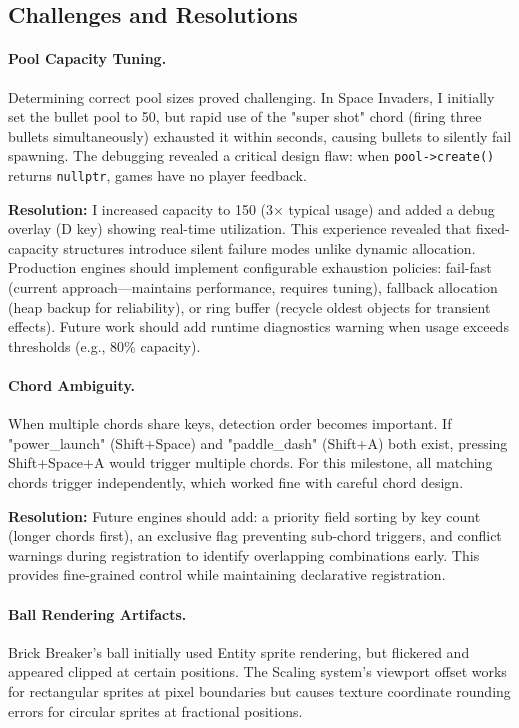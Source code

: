 \documentclass[12pt]{article}
\begin{document}
\subsection{Challenges and Resolutions}

\paragraph{Pool Capacity Tuning.}
Determining correct pool sizes proved challenging. In Space Invaders, I initially set the bullet pool to 50, but rapid use of the "super shot" chord (firing three bullets simultaneously) exhausted it within seconds, causing bullets to silently fail spawning. The debugging revealed a critical design flaw: when \texttt{pool->create()} returns \texttt{nullptr}, games have no player feedback.

\textbf{Resolution:} I increased capacity to 150 (3× typical usage) and added a debug overlay (D key) showing real-time utilization. This experience revealed that fixed-capacity structures introduce silent failure modes unlike dynamic allocation. Production engines should implement configurable exhaustion policies: fail-fast (current approach—maintains performance, requires tuning), fallback allocation (heap backup for reliability), or ring buffer (recycle oldest objects for transient effects). Future work should add runtime diagnostics warning when usage exceeds thresholds (e.g., 80\% capacity).

\paragraph{Chord Ambiguity.}
When multiple chords share keys, detection order becomes important. If "power\_launch" (Shift+Space) and "paddle\_dash" (Shift+A) both exist, pressing Shift+Space+A would trigger multiple chords. For this milestone, all matching chords trigger independently, which worked fine with careful chord design.

\textbf{Resolution:} Future engines should add: a priority field sorting by key count (longer chords first), an exclusive flag preventing sub-chord triggers, and conflict warnings during registration to identify overlapping combinations early. This provides fine-grained control while maintaining declarative registration.

\paragraph{Ball Rendering Artifacts.}
Brick Breaker's ball initially used Entity sprite rendering, but flickered and appeared clipped at certain positions. The Scaling system's viewport offset works for rectangular sprites at pixel boundaries but causes texture coordinate rounding errors for circular sprites at fractional positions.
\end{document}
